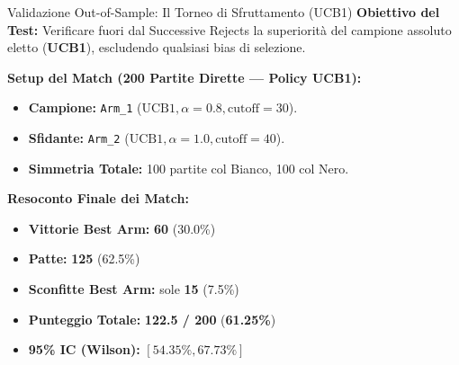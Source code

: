\documentclass[10pt]{beamer}
\begin{document}
\begin{frame}{Validazione Out-of-Sample: Il Torneo di Sfruttamento (UCB1)}
    \textbf{Obiettivo del Test:}
    Verificare fuori dal Successive Rejects la superiorità del campione assoluto eletto (\textbf{UCB1}), escludendo qualsiasi bias di selezione.
    
    \vspace{0.15cm}
    \textbf{Setup del Match (200 Partite Dirette — Policy UCB1):}
    \begin{itemize}
        \item \textbf{Campione:} \texttt{Arm\_1} ($\text{UCB1}, \alpha=0.8, \text{cutoff}=30$).
        \item \textbf{Sfidante:} \texttt{Arm\_2} ($\text{UCB1}, \alpha=1.0, \text{cutoff}=40$).
        \item \textbf{Simmetria Totale:} 100 partite col Bianco, 100 col Nero.
    \end{itemize}
    
    \vspace{0.15cm}
    \textbf{Resoconto Finale dei Match:}
    \begin{itemize}
        \item \textbf{Vittorie Best Arm:} \textbf{60} (30.0\%)
        \item \textbf{Patte:} \textbf{125} (62.5\%)
        \item \textbf{Sconfitte Best Arm:} sole \textbf{15} (7.5\%)
        \item \textbf{Punteggio Totale:} \textbf{122.5 / 200} (\textbf{61.25\%})
        \item \textbf{95\% IC (Wilson):} $[54.35\%, 67.73\%]$
    \end{itemize}
\end{frame}
\end{document}
